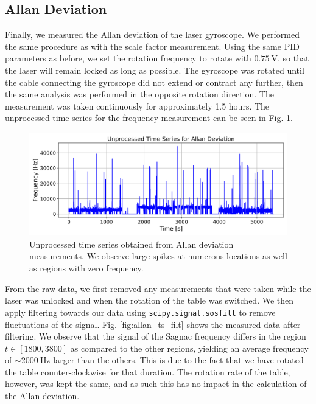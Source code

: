 \documentclass[a4paper]{report}
\numberwithin{equation}{section}
\begin{document}
\subsection{Allan Deviation}

Finally, we measured the Allan deviation of the laser gyroscope. We performed the same procedure as with the scale factor measurement. 
Using the same PID parameters as before, we set the rotation frequency to rotate with $\SI{0.75}{\volt}$, so that the laser will 
remain locked as long as possible. The gyroscope was rotated until the cable connecting the gyroscope did not extend or contract
any further, then the same analysis was performed in the opposite rotation direction. The measurement was taken continuously for 
approximately 1.5 hours. The unprocessed time series for the frequency measurement can be seen in Fig. \ref{fig:allan_ts_raw}. \par 


\begin{figure}[h!]
	\centering
	\includegraphics[width=0.8\columnwidth]{allan_ts_raw.png}
	\caption{Unprocessed time series obtained from Allan deviation measurements. We observe large
			spikes at numerous locations as well as regions with zero frequency.}
	\label{fig:allan_ts_raw}
\end{figure}

From the raw data, we first removed any measurements that were taken while the laser was unlocked and when the 
rotation of the table was switched. We then apply filtering towards our data using \texttt{scipy.signal.sosfilt} to remove
fluctuations of the signal. Fig. \ref{fig:allan_ts_filt} shows the measured data after filtering. We observe that the signal of 
the Sagnac frequency differs in the region $t \in [1800, 3800]$ as compared to the other regions, yielding an average frequency
of $\sim \SI{2000}{\hertz}$ larger than the others. This is due to the fact that we have rotated the table counter-clockwise
for that duration. The rotation rate of the table, however, was kept the same, and as such this has no impact in the 
calculation of the Allan deviation. \par 
\end{document}
